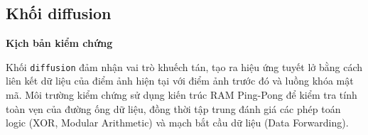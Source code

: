 %		
%		
%		
%		

\subsection{Khối diffusion}

\textbf{Kịch bản kiểm chứng}

Khối \texttt{diffusion} đảm nhận vai trò khuếch tán, tạo ra hiệu ứng tuyết lở bằng cách liên kết dữ liệu của điểm ảnh hiện tại với điểm ảnh trước đó và luồng khóa mật mã. Môi trường kiểm chứng sử dụng kiến trúc RAM Ping-Pong để kiểm tra tính toàn vẹn của đường ống dữ liệu, đồng thời tập trung đánh giá các phép toán logic (XOR, Modular Arithmetic) và mạch bắt cầu dữ liệu (Data Forwarding).

